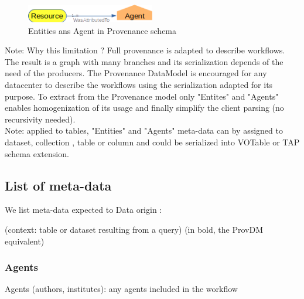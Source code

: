 \documentclass[11pt,a4paper]{ivoa}
\begin{document}
\begin{figure}[ht!]
	\includegraphics[width=0.5\textwidth]{provenance.png}
	\caption{Entities ans Agent in Provenance schema}\label{provenance}
\end{figure}

Note: Why this limitation ?
Full provenance is adapted to describe workflows. The result is a graph with many branches and its serialization depends of the need of the producers.
The Provenance DataModel is encouraged for any datacenter to describe the workflows  using the serialization adapted for its purpose. To extract from the Provenance model only "Entites" and "Agents" enables homogenization of its usage  and finally simplify the client parsing (no recursivity needed).\\

Note: applied to tables, "Entities" and "Agents" meta-data can by assigned to dataset, collection , table or column and could be serialized into VOTable or TAP schema extension.

\subsection{List of meta-data}
We list meta-data expected to Data origin :

(context: table or dataset resulting from a query)
(in bold, the ProvDM equivalent)

\subsubsection{Agents}
Agents (authors, institutes):  any agents included in the workflow 
\end{document}

